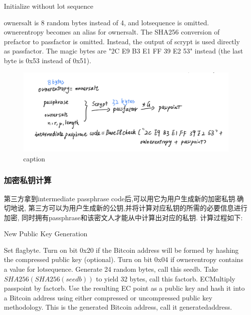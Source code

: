 \begin{algorithm}[tbp]\footnotesize
\caption{Initialize without lot sequence}
  	\begin{algorithmic}[1]
	    \STATE ownersalt is 8 random bytes instead of 4, and lotsequence is omitted. ownerentropy becomes an alias for ownersalt. 
		\STATE The SHA256 conversion of prefactor to passfactor is omitted. Instead, the output of scrypt is used directly as passfactor.
		\STATE The magic bytes are "2C E9 B3 E1 FF 39 E2 53" instead (the last byte is 0x53 instead of 0x51). 
    \end{algorithmic}
\end{algorithm}



\begin{figure}[h]
\centering
\includegraphics[width=.7\textwidth]{./im-code2.png}
\caption{caption}\label{fig-parsesig}
\end{figure}

\subsubsection{加密私钥计算}
第三方拿到intermediate passphrase code后,可以用它为用户生成新的加密私钥.确切地说,
第三方可以为用户生成新的公钥,并将计算对应私钥的所需的必要信息进行加密,
同时拥有passphrase和该密文人才能从中计算出对应的私钥.  
计算过程如下:

\begin{algorithm}[tbp]\footnotesize
\caption{New Public Key Generation}
  	\begin{algorithmic}[1]
	    \STATE Set flagbyte.
	    \STATE Turn on bit 0x20 if the Bitcoin address will be formed 
	    by hashing the compressed public key (optional). Turn on bit 0x04 
	    if ownerentropy contains a value for lotsequence.   
		\STATE Generate 24 random bytes, call this seedb. 
		Take $SHA256(SHA256(seedb))$ to yield 32 bytes, call this factorb.
		\STATE ECMultiply passpoint by factorb. Use the resulting EC point 
		as a public key and hash it into a Bitcoin address using either 
		compressed or uncompressed public key methodology. 
		This is the generated Bitcoin address, call it generatedaddress. 
    \end{algorithmic}
\end{algorithm}

